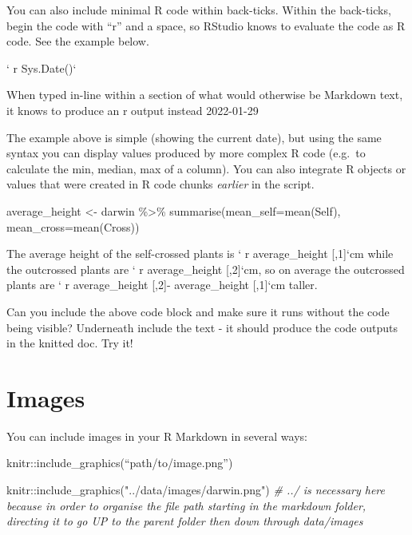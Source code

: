 \documentclass[
]{book}
\makeatletter
\newenvironment{Shaded}{\begin{snugshade}}{\end{snugshade}}
\newcommand{\AttributeTok}[1]{\textcolor[rgb]{0.77,0.63,0.00}{#1}}
\newcommand{\CommentTok}[1]{\textcolor[rgb]{0.56,0.35,0.01}{\textit{#1}}}
\newcommand{\FunctionTok}[1]{\textcolor[rgb]{0.00,0.00,0.00}{#1}}
\newcommand{\NormalTok}[1]{#1}
\newcommand{\OtherTok}[1]{\textcolor[rgb]{0.56,0.35,0.01}{#1}}
\newcommand{\SpecialCharTok}[1]{\textcolor[rgb]{0.00,0.00,0.00}{#1}}
\newcommand{\StringTok}[1]{\textcolor[rgb]{0.31,0.60,0.02}{#1}}
\newenvironment{kframe}{%
\medskip{}
\setlength{\fboxsep}{.8em}
 \def\at@end@of@kframe{}%
 \ifinner\ifhmode%
  \def\at@end@of@kframe{\end{minipage}}%
  \begin{minipage}{\columnwidth}%
 \fi\fi%
 \def\FrameCommand##1{\hskip\@totalleftmargin \hskip-\fboxsep
 \colorbox{shadecolor}{##1}\hskip-\fboxsep
     \hskip-\linewidth \hskip-\@totalleftmargin \hskip\columnwidth}%
 \MakeFramed {\advance\hsize-\width
   \@totalleftmargin\z@ \linewidth\hsize
   \@setminipage}}%
 {\par\unskip\endMakeFramed%
 \at@end@of@kframe}
\newenvironment{block}[1]
  {
  \begin{itemize}
  \renewcommand{\labelitemi}{
    \raisebox{-.7\height}[0pt][0pt]{
      {\setkeys{Gin}{width=3em,keepaspectratio}\texttt{[image: images/\#1]}}
    }
  }
  \setlength{\fboxsep}{1em}
  \begin{kframe}
  \item
  }
  {
  \end{kframe}
  \end{itemize}
  }
\newenvironment{rmdquestion}
  {\begin{block}{question}}
  {\end{block}}
\makeatother
\begin{document}
You can also include minimal R code within back-ticks. Within the back-ticks, begin the code with ``r'' and a space, so RStudio knows to evaluate the code as R code. See the example below.

` r Sys.Date()`

When typed in-line within a section of what would otherwise be Markdown text, it knows to produce an r output instead 2022-01-29

The example above is simple (showing the current date), but using the same syntax you can display values produced by more complex R code (e.g.~to calculate the min, median, max of a column). You can also integrate R objects or values that were created in R code chunks \emph{earlier} in the script.

\begin{Shaded}
\begin{Highlighting}[]
\NormalTok{average\_height }\OtherTok{\textless{}{-}}\NormalTok{ darwin }\SpecialCharTok{\%\textgreater{}\%} 
  \FunctionTok{summarise}\NormalTok{(}\AttributeTok{mean\_self=}\FunctionTok{mean}\NormalTok{(Self),}
            \AttributeTok{mean\_cross=}\FunctionTok{mean}\NormalTok{(Cross))}
\end{Highlighting}
\end{Shaded}

The average height of the self-crossed plants is ` r average\_height {[},1{]}`cm while the outcrossed plants are ` r average\_height {[},2{]}`cm, so on average the outcrossed plants are ` r average\_height {[},2{]}- average\_height {[},1{]}`cm taller.

\begin{rmdquestion}
Can you include the above code block and make sure it runs without the
code being visible? Underneath include the text - it should produce the
code outputs in the knitted doc. Try it!
\end{rmdquestion}

\hypertarget{images}{%
\section{Images}\label{images}}

You can include images in your R Markdown in several ways:

knitr::include\_graphics(``path/to/image.png'')

\begin{Shaded}
\begin{Highlighting}[]
\NormalTok{knitr}\SpecialCharTok{::}\FunctionTok{include\_graphics}\NormalTok{(}\StringTok{"../data/images/darwin.png"}\NormalTok{)}
\CommentTok{\# ../ is necessary here because in order to organise the file path starting in the markdown folder, directing it to go UP to the parent folder then down through data/images}
\end{Highlighting}
\end{Shaded}
\end{document}
